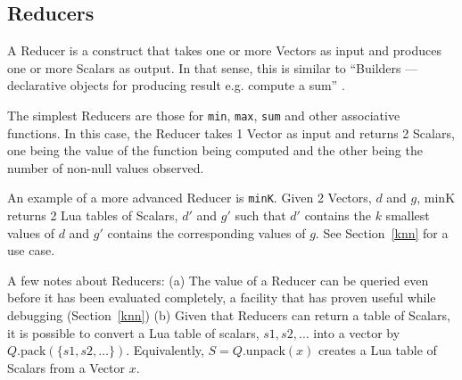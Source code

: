 \subsection{Reducers}
\label{reducers}

A Reducer is a construct that takes one or more Vectors as input and produces
one or more Scalars as output. In that sense, this is similar to ``Builders ---
declarative objects for producing result e.g. compute a sum'' \cite{Weld2017}.

The simplest Reducers are those for {\tt min},
{\tt max}, {\tt sum} and other associative functions. 
In this case, the Reducer takes 1 Vector as input and 
returns 2 Scalars, one
being the value of the function being computed and the other being the number of
non-null values observed. 

An example of a more advanced Reducer is {\tt minK}. 
Given 2 Vectors, \(d\) and \(g\), minK returns 2
Lua tables of Scalars, \(d'\) and \(g'\) such that \(d'\) contains the \(k\)
smallest values of \(d\) and \(g'\) contains the corresponding values of \(g\).
See Section~\ref{knn} for a use case.

A few notes about Reducers: (a) 
The value of a Reducer can be queried even before it has been evaluated 
completely, a facility that has proven useful while debugging
(Section~\ref{knn})
(b) Given that Reducers can return a table of Scalars,
it is possible to 
convert a Lua table of scalars, \(s1, s2, \ldots\) into a vector by
\(Q.\mathrm{pack}(\{s1, s2, \ldots\})\).
Equivalently, \(S = Q.\mathrm{unpack}(x)\) creates a Lua table of Scalars from a
Vector \(x\).

